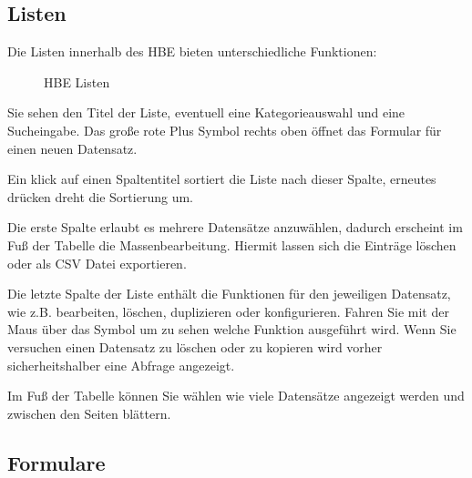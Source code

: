 \documentclass[letterpaper,10pt,ngerman]{sphinxmanual}
\begin{document}
\subsection{Listen}
\label{\detokenize{hbe/intro:listen}}
Die Listen innerhalb des HBE bieten unterschiedliche Funktionen:

\begin{figure}[htbp]
\centering
\capstart

\noindent{}
\caption{HBE Listen}\label{\detokenize{hbe/intro:id2}}\end{figure}

\begin{sphinxShadowBox}

\begin{center}
\noindent{}
\end{center}
\end{sphinxShadowBox}

Sie sehen den Titel der Liste, eventuell eine Kategorieauswahl und eine Sucheingabe.
Das große rote Plus Symbol \sphinxstyleemphasis{} rechts oben öffnet das Formular für einen neuen Datensatz.

Ein klick auf einen Spaltentitel sortiert die Liste nach dieser Spalte, erneutes drücken
dreht die Sortierung um.

Die erste Spalte erlaubt es mehrere Datensätze anzuwählen, dadurch erscheint im Fuß der Tabelle die Massenbearbeitung.
Hiermit lassen sich die Einträge löschen oder als CSV Datei exportieren.

Die letzte Spalte der Liste enthält die Funktionen für den jeweiligen Datensatz, wie z.B. bearbeiten, löschen,
duplizieren oder konfigurieren. Fahren Sie mit der Maus über das Symbol um zu sehen welche Funktion ausgeführt wird.
Wenn Sie versuchen einen Datensatz zu löschen oder zu kopieren wird vorher sicherheitshalber eine Abfrage angezeigt.

Im Fuß der Tabelle können Sie wählen wie viele Datensätze angezeigt werden und zwischen den Seiten blättern.


\subsection{Formulare}
\label{\detokenize{hbe/intro:formulare}}
\begin{sphinxShadowBox}

\begin{center}
\noindent{}
\end{center}
\end{sphinxShadowBox}
\end{document}
